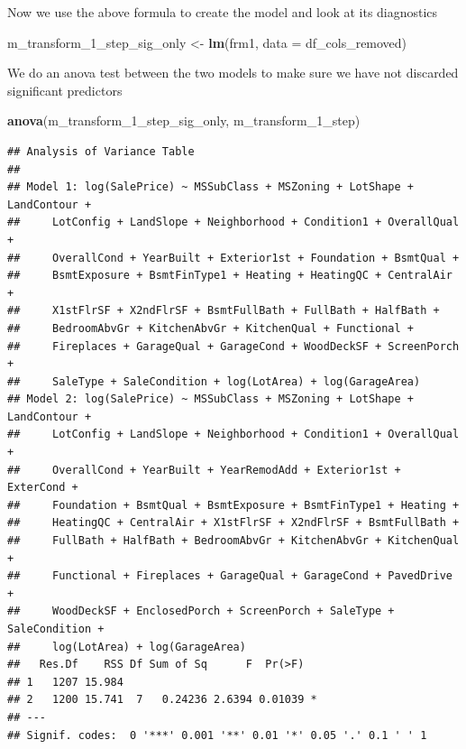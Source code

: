 \documentclass[
]{article}
\newenvironment{Shaded}{\begin{snugshade}}{\end{snugshade}}
\newcommand{\DataTypeTok}[1]{\textcolor[rgb]{0.13,0.29,0.53}{#1}}
\newcommand{\DecValTok}[1]{\textcolor[rgb]{0.00,0.00,0.81}{#1}}
\newcommand{\KeywordTok}[1]{\textcolor[rgb]{0.13,0.29,0.53}{\textbf{#1}}}
\newcommand{\NormalTok}[1]{#1}
\newcommand{\StringTok}[1]{\textcolor[rgb]{0.31,0.60,0.02}{#1}}
\begin{document}
Now we use the above formula to create the model and look at its diagnostics

\begin{Shaded}
\begin{Highlighting}[]
\NormalTok{m_transform_}\DecValTok{1}\NormalTok{_step_sig_only <-}\StringTok{ }\KeywordTok{lm}\NormalTok{(frm1, }\DataTypeTok{data =}\NormalTok{ df_cols_removed)}
\end{Highlighting}
\end{Shaded}

We do an anova test between the two models to make sure we have not discarded significant predictors

\begin{Shaded}
\begin{Highlighting}[]
\KeywordTok{anova}\NormalTok{(m_transform_}\DecValTok{1}\NormalTok{_step_sig_only, m_transform_}\DecValTok{1}\NormalTok{_step)}
\end{Highlighting}
\end{Shaded}

\begin{verbatim}
## Analysis of Variance Table
## 
## Model 1: log(SalePrice) ~ MSSubClass + MSZoning + LotShape + LandContour + 
##     LotConfig + LandSlope + Neighborhood + Condition1 + OverallQual + 
##     OverallCond + YearBuilt + Exterior1st + Foundation + BsmtQual + 
##     BsmtExposure + BsmtFinType1 + Heating + HeatingQC + CentralAir + 
##     X1stFlrSF + X2ndFlrSF + BsmtFullBath + FullBath + HalfBath + 
##     BedroomAbvGr + KitchenAbvGr + KitchenQual + Functional + 
##     Fireplaces + GarageQual + GarageCond + WoodDeckSF + ScreenPorch + 
##     SaleType + SaleCondition + log(LotArea) + log(GarageArea)
## Model 2: log(SalePrice) ~ MSSubClass + MSZoning + LotShape + LandContour + 
##     LotConfig + LandSlope + Neighborhood + Condition1 + OverallQual + 
##     OverallCond + YearBuilt + YearRemodAdd + Exterior1st + ExterCond + 
##     Foundation + BsmtQual + BsmtExposure + BsmtFinType1 + Heating + 
##     HeatingQC + CentralAir + X1stFlrSF + X2ndFlrSF + BsmtFullBath + 
##     FullBath + HalfBath + BedroomAbvGr + KitchenAbvGr + KitchenQual + 
##     Functional + Fireplaces + GarageQual + GarageCond + PavedDrive + 
##     WoodDeckSF + EnclosedPorch + ScreenPorch + SaleType + SaleCondition + 
##     log(LotArea) + log(GarageArea)
##   Res.Df    RSS Df Sum of Sq      F  Pr(>F)  
## 1   1207 15.984                              
## 2   1200 15.741  7   0.24236 2.6394 0.01039 *
## ---
## Signif. codes:  0 '***' 0.001 '**' 0.01 '*' 0.05 '.' 0.1 ' ' 1
\end{verbatim}
\end{document}
